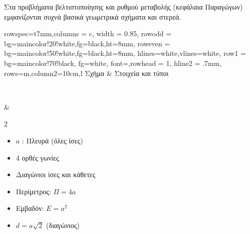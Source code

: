 Στα προβλήματα βελτιστοποίησης και ρυθμού μεταβολής (κεφάλαια Παραγώγων) εμφανίζονται συχνά βασικά γεωμετρικά σχήματα και στερεά.
\begin{center}
\begin{longtblr}{
rowspec={t{7mm}},columns = {c},
  width = 0.85\linewidth,
  row{odd} = {bg=maincolor!20!white,fg=black,ht=8mm},
 row{even} = {bg=maincolor!50!white,fg=black,ht=8mm},
hlines={white},vlines={white},
row{1} = {bg=maincolor!70!black, fg=white, font=\bfseries{}},rowhead = 1,
  hline{2} = {.7mm}, %
rows={m},column{2}={10cm,l}}
Σχήμα & Στοιχεία και τύποι\\
{\\
} & {
\begin{multicols}{2}
\begin{itemize}[noitemsep]
\item $a$ : Πλευρά (όλες ίσες)
\item 4 ορθές γωνίες
\item Διαγώνιοι ίσες και κάθετες
\end{itemize}
\vspace{-4mm}\begin{itemize}[noitemsep]
\item  Περίμετρος: $\Pi=4a$
\item  Εμβαδόν: $E=a^2$
\item  $d=a\sqrt{2}$ (διαγώνιος)
\end{itemize}
\end{multicols}}\\


\end{longtblr}
\end{center}
